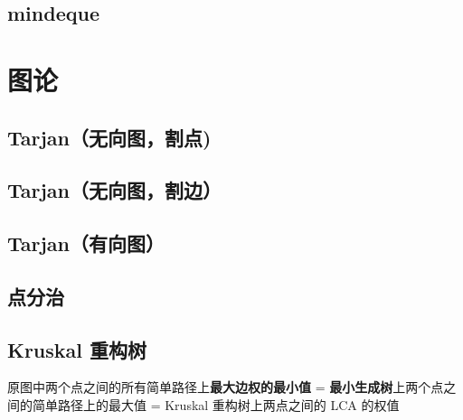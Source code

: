 \documentclass[12pt]{article}
\begin{document}


\newpage

\subsection{mindeque}



\newpage

{\centering\section{图论}}

\subsection{Tarjan（无向图，割点)}



\newpage

\subsection{Tarjan（无向图，割边）}



\newpage

\subsection{Tarjan（有向图）}



\newpage

\subsection{点分治}



\newpage

\subsection{Kruskal 重构树}

原图中两个点之间的所有简单路径上\textbf{最大边权的最小值} = \textbf{最小生成树}上两个点之间的简单路径上的最大值 = Kruskal 重构树上两点之间的 LCA 的权值
\end{document}
